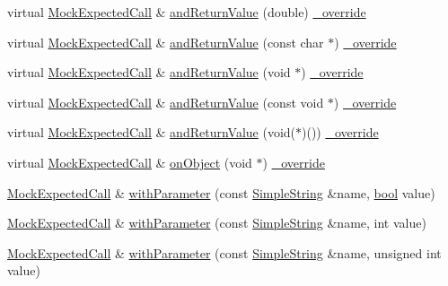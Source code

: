 \begin{DoxyCompactItemize}
\item 
virtual \hyperlink{class_mock_expected_call}{Mock\+Expected\+Call} \& \hyperlink{class_mock_ignored_expected_call_ad266766a046c623115f3fbf6cf10af6d}{and\+Return\+Value} (double) \hyperlink{_cpp_u_test_config_8h_a049bea15dd750e15869863c94c1efc3b}{\+\_\+override}
\item 
virtual \hyperlink{class_mock_expected_call}{Mock\+Expected\+Call} \& \hyperlink{class_mock_ignored_expected_call_afa12efadc7d085d4aebcc9660d97b066}{and\+Return\+Value} (const char $\ast$) \hyperlink{_cpp_u_test_config_8h_a049bea15dd750e15869863c94c1efc3b}{\+\_\+override}
\item 
virtual \hyperlink{class_mock_expected_call}{Mock\+Expected\+Call} \& \hyperlink{class_mock_ignored_expected_call_abd9fab8eb0e381aca7fd2e57a47296ec}{and\+Return\+Value} (void $\ast$) \hyperlink{_cpp_u_test_config_8h_a049bea15dd750e15869863c94c1efc3b}{\+\_\+override}
\item 
virtual \hyperlink{class_mock_expected_call}{Mock\+Expected\+Call} \& \hyperlink{class_mock_ignored_expected_call_a9346d732a2bd0b170336daa623375931}{and\+Return\+Value} (const void $\ast$) \hyperlink{_cpp_u_test_config_8h_a049bea15dd750e15869863c94c1efc3b}{\+\_\+override}
\item 
virtual \hyperlink{class_mock_expected_call}{Mock\+Expected\+Call} \& \hyperlink{class_mock_ignored_expected_call_ab8b6a21b4c1a3f3e8b3548a6bcf47625}{and\+Return\+Value} (void($\ast$)()) \hyperlink{_cpp_u_test_config_8h_a049bea15dd750e15869863c94c1efc3b}{\+\_\+override}
\item 
virtual \hyperlink{class_mock_expected_call}{Mock\+Expected\+Call} \& \hyperlink{class_mock_ignored_expected_call_a76ce27310442aaccfb89803881417d38}{on\+Object} (void $\ast$) \hyperlink{_cpp_u_test_config_8h_a049bea15dd750e15869863c94c1efc3b}{\+\_\+override}
\item 
\hyperlink{class_mock_expected_call}{Mock\+Expected\+Call} \& \hyperlink{class_mock_expected_call_a9d735dfb585c1351650fcfad40f138bc}{with\+Parameter} (const \hyperlink{class_simple_string}{Simple\+String} \&name, \hyperlink{avb__gptp_8h_af6a258d8f3ee5206d682d799316314b1}{bool} value)
\item 
\hyperlink{class_mock_expected_call}{Mock\+Expected\+Call} \& \hyperlink{class_mock_expected_call_a8f249d5f2a770017be7a146ad4c28022}{with\+Parameter} (const \hyperlink{class_simple_string}{Simple\+String} \&name, int value)
\item 
\hyperlink{class_mock_expected_call}{Mock\+Expected\+Call} \& \hyperlink{class_mock_expected_call_a342cb778380da454c56e240fae0186be}{with\+Parameter} (const \hyperlink{class_simple_string}{Simple\+String} \&name, unsigned int value)

\end{DoxyCompactItemize}
